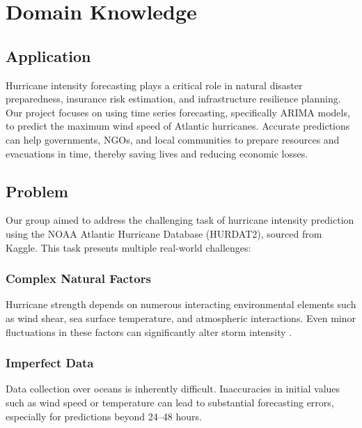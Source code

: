 %
%
%

	\chapter{Domain Knowledge}
	


\section{Application}
Hurricane intensity forecasting plays a critical role in natural disaster preparedness, insurance risk estimation, and infrastructure resilience planning. Our project focuses on using time series forecasting, specifically ARIMA models, to predict the maximum wind speed of Atlantic hurricanes. Accurate predictions can help governments, NGOs, and local communities to prepare resources and evacuations in time, thereby saving lives and reducing economic losses.

\section{Problem}
Our group aimed to address the challenging task of hurricane intensity prediction using the NOAA Atlantic Hurricane Database (HURDAT2), sourced from Kaggle. This task presents multiple real-world challenges:

\subsection{Complex Natural Factors}
Hurricane strength depends on numerous interacting environmental elements such as wind shear, sea surface temperature, and atmospheric interactions. Even minor fluctuations in these factors can significantly alter storm intensity \cite{emanuel2003tropical, kaplan2003large}.

\subsection{Imperfect Data}
Data collection over oceans is inherently difficult. Inaccuracies in initial values such as wind speed or temperature can lead to substantial forecasting errors, especially for predictions beyond 24–48 hours.

